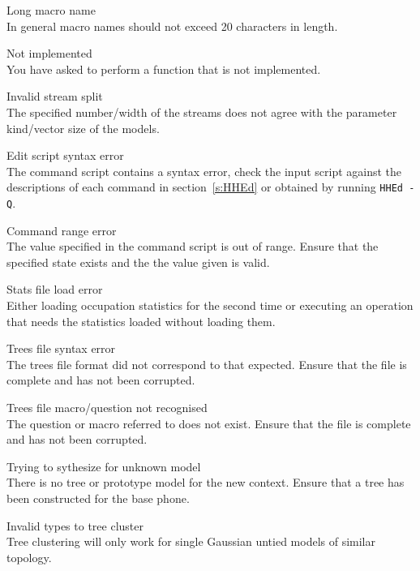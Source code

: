\begin{itemize}
\begin{itemize}
    Long macro name\\
        In general macro names should not exceed 20 characters in length.

    Not implemented\\
        You have asked  to perform a function that is not 
        implemented.

    Invalid stream split\\
        The specified number/width of the streams does not agree with the 
        parameter kind/vector size of the models.

    Edit script syntax error\\
        The  command script contains a syntax error, check the 
        input script against the descriptions of each command in 
        section~\ref{s:HHEd} or obtained by running \texttt{HHEd -Q}.

    Command range error\\
        The value specified in the command script is out of range.  Ensure that
        the specified state exists and the the value given is valid.

 Stats file load error\\
        Either loading occupation statistics for the second time or executing 
        an operation that needs the statistics loaded without loading them.

    Trees file syntax error\\
        The trees file format did not correspond to that expected.  Ensure that
        the file is complete and has not been corrupted.

    Trees file macro/question not recognised\\
        The question or macro referred to does not exist.  Ensure that the file
        is complete and has not been corrupted.

    Trying to sythesize for unknown model\\
        There is no tree or prototype model for the new context.  Ensure that a
        tree has been constructed for the base phone.

 Invalid types to tree cluster\\
        Tree clustering will only work for single Gaussian untied models of
        similar topology.

\end{itemize}


\end{itemize}
